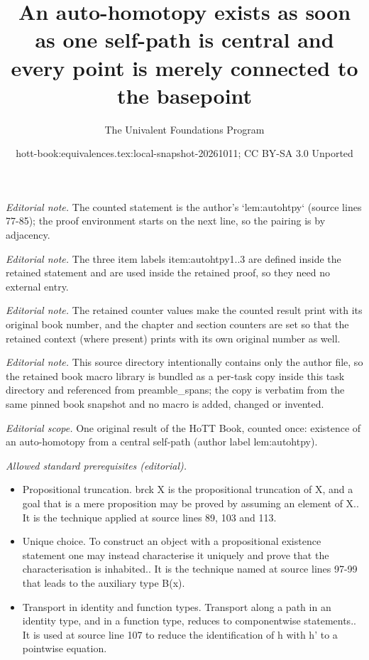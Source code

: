 \documentclass[10pt,a4paper]{article}
\title{An auto-homotopy exists as soon as one self-path is central and every point is merely connected to the basepoint}
\author{The Univalent Foundations Program}
\date{hott-book:equivalences.tex:local-snapshot-20261011; CC BY-SA 3.0 Unported}
\newcounter{chapter}
\theoremstyle{definition}
\theoremstyle{remark}
\numberwithin{equation}{section}
\begin{document}
\maketitle
\setcounter{chapter}{4}
\setcounter{section}{1}
\setcounter{thm}{1}
\noindent\textit{Editorial note.} The counted statement is the author's `lem:autohtpy` (source lines 77-85); the proof environment starts on the next line, so the pairing is by adjacency.\par\medskip
\noindent\textit{Editorial note.} The three item labels item:autohtpy1..3 are defined inside the retained statement and are used inside the retained proof, so they need no external entry.\par\medskip
\noindent\textit{Editorial note.} The retained counter values make the counted result print with its original book number, and the chapter and section counters are set so that the retained context (where present) prints with its own original number as well.\par\medskip
\noindent\textit{Editorial note.} This source directory intentionally contains only the author file, so the retained book macro library is bundled as a per-task copy inside this task directory and referenced from preamble\_spans; the copy is verbatim from the same pinned book snapshot and no macro is added, changed or invented.\par\medskip
\noindent\textit{Editorial scope.} One original result of the HoTT Book, counted once: existence of an auto-homotopy from a central self-path (author label lem:autohtpy).\par\medskip
\noindent\textit{Allowed standard prerequisites (editorial).}\begin{itemize}
\item Propositional truncation. brck X is the propositional truncation of X, and a goal that is a mere proposition may be proved by assuming an element of X.. It is the technique applied at source lines 89, 103 and 113.
\item Unique choice. To construct an object with a propositional existence statement one may instead characterise it uniquely and prove that the characterisation is inhabited.. It is the technique named at source lines 97-99 that leads to the auxiliary type B(x).
\item Transport in identity and function types. Transport along a path in an identity type, and in a function type, reduces to componentwise statements.. It is used at source line 107 to reduce the identification of h with h' to a pointwise equation.
\end{itemize}\medskip
\end{document}
